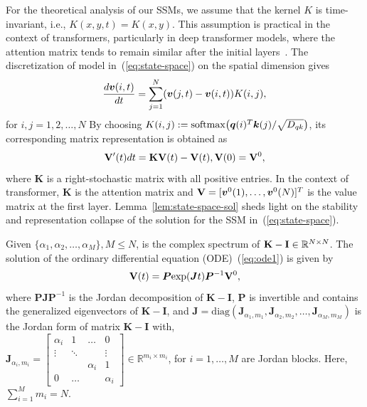 \label{subsec:state-space-analysis}
For the theoretical analysis of our SSMs, we assume that the kernel $K$ is time-invariant, i.e.,
$K(x,y,t)=K(x,y)$. This assumption is practical in the context of transformers, particularly in deep transformer models, where the attention matrix tends to remain similar after the initial layers~\cite{shi2022revisiting}.
The discretization of model in~(\ref{eq:state-space}) on the spatial dimension gives
\begin{equation}
\nonumber
    \displaystyle \frac{d{\bm v}(i, t)}{dt} =\displaystyle \sum_{j = 1}^N({\bm v}(j, t) - {\bm v}(i, t))K(i, j), 
\end{equation}
for $i,j = 1, 2, \dots, N$
By choosing $K(i,j):= {\rm softmax}\bigl({\bm q}(i)^{T}{\bm k}(j)/\sqrt{D_{qk}}\bigl)$, its corresponding matrix representation is obtained as
\begin{align}
\label{eq:ode1}
    {\mathbf V}'(t){dt} = {\mathbf K}{\mathbf V}(t) - {\mathbf V}(t), {\mathbf V}(0) = {\mathbf V}^0,
\end{align}
where $\bm{K}$ is a right-stochastic matrix with all positive entries. In the context of transformer, $\bm{K}$ is the attention matrix and ${\mathbf V} = [{\bm v}^0(1), \dots, {\bm v}^0(N)]^T$ is the value matrix at the first layer.
Lemma~\ref{lem:state-space-sol} sheds light on the stability and representation collapse of the solution for the SSM in~(\ref{eq:state-space}).
\begin{lemma}
    \label{lem:state-space-sol}
    Given $\{\alpha_1, \alpha_2,\dots, \alpha_M\}, M \leq N$, is the complex spectrum of ${\mathbf K} - {\mathbf I} \in \mathbb{R}^{N \times N}$. The solution of the ordinary differential equation (ODE)~(\ref{eq:ode1}) is given by
    \begin{align}
    \label{eq:state-space-sol}
        {\mathbf V}(t) = \bm{P}\mathrm{exp}(\bm{J}t)\bm{P}^{-1}{\mathbf V}^0,
    \end{align}
where $\bm{P}\bm{J}\bm{P}^{-1}$ is the Jordan decomposition of $\bm{K} - \bm{I}$, $\bm{P}$ is invertible and contains the generalized eigenvectors of $\bm{K} - \bm{I}$, and $\bm{J} = \bm{\mathrm{diag}}(\bm{J}_{\alpha_1, m_1}, \bm{J}_{\alpha_2, m_2}, \dots, \bm{J}_{\alpha_M, m_M}) $ is the Jordan form of matrix $\bm{K} - \bm{I}$ with,\\
$\bm{J}_{\alpha_i, m_i} = \begin{bmatrix} 
    \alpha_i &  1& \dots &0\\
   \vdots & \ddots & & \vdots\\
    &  & \alpha_i& 1\\
    0 & \dots    &   & \alpha_i
    \end{bmatrix} \in \mathbb{R}^{m_i \times m_i}$, for $i = 1, \dots, M$ are Jordan blocks. Here, $\sum_{i = 1}^Mm_i = N$.
\end{lemma}

